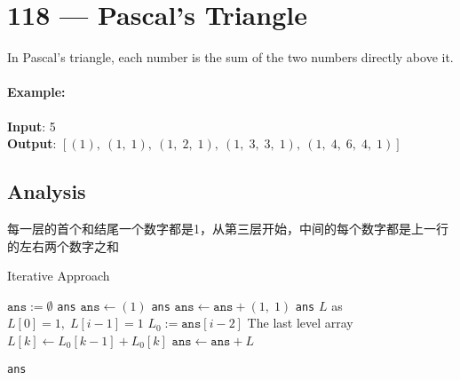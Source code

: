 \section{118 --- Pascal's Triangle}
In Pascal's triangle, each number is the sum of the two numbers directly above it.
\paragraph{Example:}
\begin{flushleft}
\textbf{Input}: 5
\\
\textbf{Output}:
$\left[(1),\ (1,\;1),\ (1,\;2,\;1),\ (1,\;3,\;3,\;1),\ (1,\;4,\;6,\;4,\;1)\right]$
\end{flushleft}
\subsection{Analysis}
\begin{CJK*}{UTF8}{gbsn}
每一层的首个和结尾一个数字都是1，从第三层开始，中间的每个数字都是上一行的左右两个数字之和
\end{CJK*}
\setcounter{algorithm}{0}
\begin{algorithm}[H]
\caption{Iterative Approach}
\begin{algorithmic}[1]
\State $\texttt{ans}:=\emptyset$
\State \Return \texttt{ans}
\EndIf
\State $\texttt{ans}\gets (1)$
\State \Return \texttt{ans}
\EndIf
\State $\texttt{ans}\gets \texttt{ans} + (1,\;1)$
\State \Return \texttt{ans}
\EndIf
{}
\State $L$ as $L[0]=1,\;L[i-1]=1$
\State $L_0:=\texttt{ans}[i-2]$ \Comment The last level array
\State $L[k]\gets L_0[k-1] + L_0[k]$
\EndFor
\State $\texttt{ans}\gets \texttt{ans} + L$
\EndFor
{}
\end{algorithmic}
\end{algorithm}
\begin{algorithm}[H]
\begin{algorithmic}[1]
\State \Return \texttt{ans}
\EndProcedure
\end{algorithmic}
\end{algorithm}
